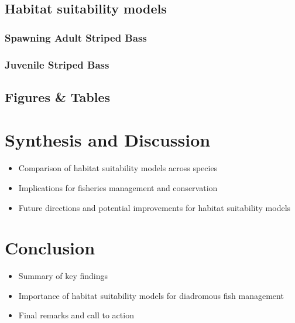 \documentclass[
]{book}
\providecommand{\tightlist}{%
  \setlength{\itemsep}{0pt}\setlength{\parskip}{0pt}}
\begin{document}
\hypertarget{habitat-suitability-models-9}{%
\section{Habitat suitability models}\label{habitat-suitability-models-9}}

\hypertarget{spawning-adult-striped-bass-1}{%
\subsection{Spawning Adult Striped Bass}\label{spawning-adult-striped-bass-1}}

\hypertarget{juvenile-striped-bass-1}{%
\subsection{Juvenile Striped Bass}\label{juvenile-striped-bass-1}}

\hypertarget{figures-tables-9}{%
\section{Figures \& Tables}\label{figures-tables-9}}

\hypertarget{synthesis-and-discussion}{%
\chapter{Synthesis and Discussion}\label{synthesis-and-discussion}}

\begin{itemize}
\tightlist
\item
  Comparison of habitat suitability models across species
\item
  Implications for fisheries management and conservation
\item
  Future directions and potential improvements for habitat suitability models
\end{itemize}

\hypertarget{conclusion}{%
\chapter{Conclusion}\label{conclusion}}

\begin{itemize}
\tightlist
\item
  Summary of key findings
\item
  Importance of habitat suitability models for diadromous fish management
\item
  Final remarks and call to action
\end{itemize}

  
\end{document}
